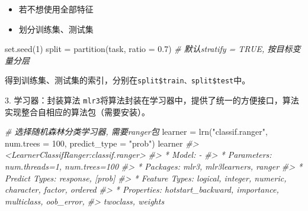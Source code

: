 \documentclass[
  11pt,
  ignorenonframetext,
  dvipsnames,UTF8]{beamer}
\newenvironment{Shaded}{\begin{snugshade}}{\end{snugshade}}
\newcommand{\AttributeTok}[1]{\textcolor[rgb]{0.77,0.63,0.00}{#1}}
\newcommand{\CommentTok}[1]{\textcolor[rgb]{0.56,0.35,0.01}{\textit{#1}}}
\newcommand{\DecValTok}[1]{\textcolor[rgb]{0.00,0.00,0.81}{#1}}
\newcommand{\FloatTok}[1]{\textcolor[rgb]{0.00,0.00,0.81}{#1}}
\newcommand{\FunctionTok}[1]{\textcolor[rgb]{0.00,0.00,0.00}{#1}}
\newcommand{\NormalTok}[1]{#1}
\newcommand{\OtherTok}[1]{\textcolor[rgb]{0.56,0.35,0.01}{#1}}
\newcommand{\SpecialCharTok}[1]{\textcolor[rgb]{0.00,0.00,0.00}{#1}}
\newcommand{\StringTok}[1]{\textcolor[rgb]{0.31,0.60,0.02}{#1}}
\providecommand{\tightlist}{%
  \setlength{\itemsep}{0pt}\setlength{\parskip}{0pt}}
\begin{document}
\begin{frame}[fragile]{}
\protect\hypertarget{section-3}{}
\begin{itemize}
\tightlist
\item
  若不想使用全部特征
\end{itemize}

\begin{Shaded}
\end{Shaded}

\begin{itemize}
\tightlist
\item
  划分训练集、测试集
\end{itemize}

\begin{Shaded}
\begin{Highlighting}[]
\FunctionTok{set.seed}\NormalTok{(}\DecValTok{1}\NormalTok{)}
\NormalTok{split }\OtherTok{=} \FunctionTok{partition}\NormalTok{(task, }\AttributeTok{ratio =} \FloatTok{0.7}\NormalTok{)  }
\CommentTok{\# 默认stratify = TRUE, 按目标变量分层}
\end{Highlighting}
\end{Shaded}

得到训练集、测试集的索引，分别在\texttt{split\$train、split\$test}中。
\end{frame}

\begin{frame}[fragile]{3. 学习器：封装算法}
\protect\hypertarget{ux5b66ux4e60ux5668ux5c01ux88c5ux7b97ux6cd5}{}
\texttt{mlr3}将算法封装在学习器中，提供了统一的方便接口，算法实现整合自相应的算法包（需要安装）。

\begin{Shaded}
\begin{Highlighting}[]
\CommentTok{\# 选择随机森林分类学习器, 需要ranger包}
\NormalTok{learner }\OtherTok{=} \FunctionTok{lrn}\NormalTok{(}\StringTok{"classif.ranger"}\NormalTok{, }\AttributeTok{num.trees =} \DecValTok{100}\NormalTok{, }
              \AttributeTok{predict\_type =} \StringTok{"prob"}\NormalTok{)}
\NormalTok{learner}
\CommentTok{\#\textgreater{} \textless{}LearnerClassifRanger:classif.ranger\textgreater{}}
\CommentTok{\#\textgreater{} * Model: {-}}
\CommentTok{\#\textgreater{} * Parameters: num.threads=1, num.trees=100}
\CommentTok{\#\textgreater{} * Packages: mlr3, mlr3learners, ranger}
\CommentTok{\#\textgreater{} * Predict Types:  response, [prob]}
\CommentTok{\#\textgreater{} * Feature Types: logical, integer, numeric, character, factor, ordered}
\CommentTok{\#\textgreater{} * Properties: hotstart\_backward, importance, multiclass, oob\_error,}
\CommentTok{\#\textgreater{}   twoclass, weights}
\end{Highlighting}
\end{Shaded}
\end{frame}
\end{document}
